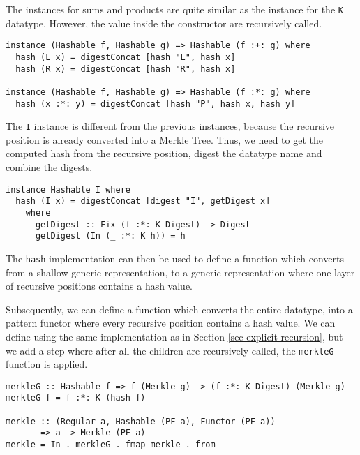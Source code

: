 The instances for sums and products are quite similar as the instance for the \texttt{K} datatype. However, the value inside the constructor are recursively called.

\begin{verbatim}
instance (Hashable f, Hashable g) => Hashable (f :+: g) where
  hash (L x) = digestConcat [hash "L", hash x]
  hash (R x) = digestConcat [hash "R", hash x]

instance (Hashable f, Hashable g) => Hashable (f :*: g) where
  hash (x :*: y) = digestConcat [hash "P", hash x, hash y]
\end{verbatim}

The \texttt{I} instance is different from the previous instances, because the recursive position is already converted into a Merkle Tree. Thus, we need to get the computed hash from the recursive position, digest the datatype name and combine the digests. 

\begin{verbatim}
instance Hashable I where
  hash (I x) = digestConcat [digest "I", getDigest x]
    where
      getDigest :: Fix (f :*: K Digest) -> Digest
      getDigest (In (_ :*: K h)) = h
\end{verbatim}

The \texttt{hash} implementation can then be used to define a function  which converts from a shallow generic representation, to a generic representation where one layer of recursive positions contains a hash value. 

Subsequently, we can define a function  which converts the entire datatype, into a pattern functor where every recursive position contains a hash value. We can define  using the same implementation as in Section \ref*{sec-explicit-recursion}, but we add a step where after all the children are recursively called, the \texttt{merkleG} function is applied. 

\begin{verbatim}
merkleG :: Hashable f => f (Merkle g) -> (f :*: K Digest) (Merkle g)
merkleG f = f :*: K (hash f)

merkle :: (Regular a, Hashable (PF a), Functor (PF a))
       => a -> Merkle (PF a)
merkle = In . merkleG . fmap merkle . from
\end{verbatim}

